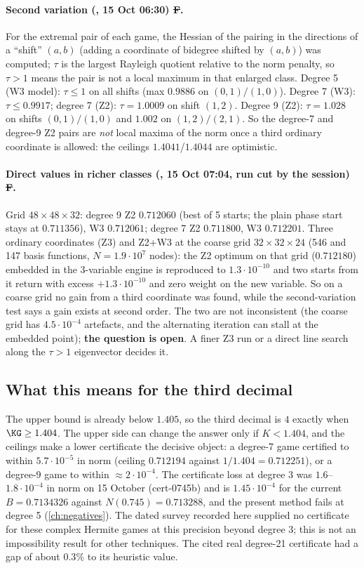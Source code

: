 \paragraph{Second variation (, 15 Oct 06:30) \st{F}.} For the extremal pair of each game, the Hessian of the pairing in the directions
of a ``shift'' $(a,b)$ (adding a coordinate of bidegree shifted by $(a,b)$) was computed; $\tau$ is the largest Rayleigh quotient relative to the
norm penalty, so $\tau>1$ means the pair is not a local maximum in that enlarged class. Degree 5 (W3 model): $\tau\le1$ on all shifts (max
$0.9886$ on $(0,1)/(1,0)$). Degree 7 (W3): $\tau\le0.9917$; degree 7 (Z2): $\tau=1.0009$ on shift $(1,2)$. Degree 9 (Z2): $\tau=1.028$ on shifts
$(0,1)/(1,0)$ and $1.002$ on $(1,2)/(2,1)$. So the degree-7 and degree-9 Z2 pairs are \emph{not} local maxima of the norm once a third ordinary
coordinate is allowed: the ceilings $1.4041$/$1.4044$ are optimistic.
\paragraph{Direct values in richer classes (, 15 Oct 07:04, run cut by the session) \st{F}.} Grid $48\times48\times32$: degree 9 Z2
$0.712060$ (best of 5 starts; the plain phase start stays at $0.711356$), W3 $0.712061$; degree 7 Z2 $0.711800$, W3 $0.712201$. Three ordinary
coordinates (Z3) and Z2+W3 at the coarse grid $32\times32\times24$ (546 and 147 basis functions, $N=1.9\cdot10^7$ nodes): the Z2 optimum on that grid
($0.712180$) embedded in the 3-variable engine is reproduced to $1.3\cdot10^{-10}$ and two starts from it return with excess $+1.3\cdot10^{-10}$ and
zero weight on the new variable. So on a coarse grid no gain from a third coordinate was found, while the second-variation test says a gain exists
at second order. The two are not inconsistent (the coarse grid has $4.5\cdot10^{-4}$ artefacts, and the alternating iteration can stall at the
embedded point); \textbf{the question is open}. A finer Z3 run or a direct line search along the $\tau>1$ eigenvector decides it.

\subsection{What this means for the third decimal}
The upper bound is already below $1.405$, so the third decimal is $4$ exactly when $\KG\ge1.404$. The upper side can change the answer only if
$K<1.404$, and the ceilings make a lower certificate the decisive object: a degree-7 game certified to within $5.7\cdot10^{-5}$ in norm (ceiling
$0.712194$ against $1/1.404=0.712251$), or a degree-9 game to within $\approx2\cdot10^{-4}$. The certificate loss at degree 3 was
$1.6$--$1.8\cdot10^{-4}$ in norm on 15 October (cert-0745b) and is $1.45\cdot10^{-4}$ for the current $B=0.7134326$ against $N(0.745)=0.713288$, and the present method fails at degree 5 (\autoref{ch:negatives}). The dated survey recorded here supplied no certificate for these complex Hermite games at this precision beyond degree 3; this is not an impossibility result for other techniques. The cited real degree-21 certificate had a gap of about $0.3\%$ to its heuristic value.
